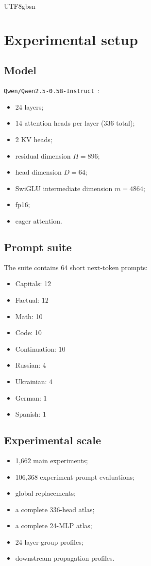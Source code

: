 \documentclass[11pt]{article}
\providecommand{\tightlist}{\setlength{\itemsep}{0pt}\setlength{\parskip}{0pt}}
\begin{document}
\begin{CJK*}{UTF8}{gbsn}
\section{Experimental setup}

\subsection{Model}

\texttt{Qwen/Qwen2.5-0.5B-Instruct}~\citep{qwen2024technical}:

\begin{itemize}
\tightlist
\item
  24 layers;
\item
  14 attention heads per layer (336 total);
\item
  2 KV heads;
\item
  residual dimension \(H=896\);
\item
  head dimension \(D=64\);
\item
  SwiGLU intermediate dimension \(m=4864\);
\item
  fp16;
\item
  eager attention.
\end{itemize}

\subsection{Prompt suite}

The suite contains 64 short next-token prompts:

\begin{itemize}
\tightlist
\item
  Capitals: 12
\item
  Factual: 12
\item
  Math: 10
\item
  Code: 10
\item
  Continuation: 10
\item
  Russian: 4
\item
  Ukrainian: 4
\item
  German: 1
\item
  Spanish: 1
\end{itemize}

\subsection{Experimental scale}

\begin{itemize}
\tightlist
\item
  1,662 main experiments;
\item
  106,368 experiment-prompt evaluations;
\item
  global replacements;
\item
  a complete 336-head atlas;
\item
  a complete 24-MLP atlas;
\item
  24 layer-group profiles;
\item
  downstream propagation profiles.
\end{itemize}


\end{CJK*}
\end{document}
